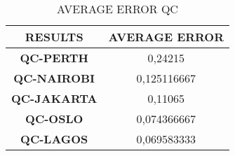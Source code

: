\begin{table}[!ht]
    \centering
    \begin{tabular}{cc}
    \hline
        \textbf{RESULTS} & \textbf{AVERAGE ERROR } \\ \hline
        \textbf{QC-PERTH} & 0,24215  \\ 
        \textbf{QC-NAIROBI} & 0,125116667  \\ 
        \textbf{QC-JAKARTA} & 0,11065  \\ 
        \textbf{QC-OSLO} & 0,074366667  \\ 
        \textbf{QC-LAGOS} & 0,069583333 \\ \hline
    \end{tabular}
    \caption{AVERAGE ERROR QC}
\end{table}